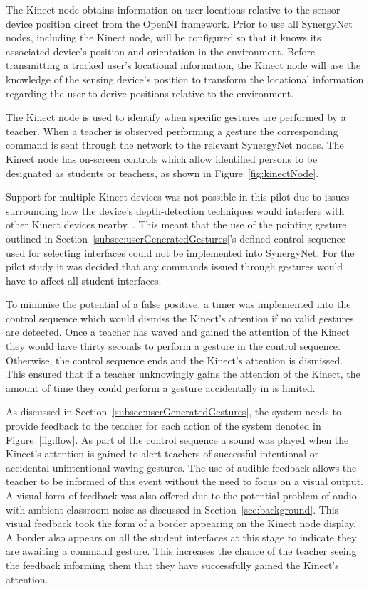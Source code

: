 \documentclass[link]{IWCOMP}
\begin{document}
The Kinect node obtains information on user locations relative to the sensor device position direct from the OpenNI framework.
Prior to use all SynergyNet nodes, including the Kinect node, will be configured so that it knows its associated device's position and orientation in the environment.
Before transmitting a tracked user's locational information, the Kinect node will use the knowledge of the sensing device's position to transform the locational information regarding the user to derive positions relative to the environment.

The Kinect node is used to identify when specific gestures are performed by a teacher.
When a teacher is observed performing a gesture the corresponding command is sent through the network to the relevant SynergyNet nodes.
The Kinect node has on-screen controls which allow identified persons to be designated as students or teachers, as shown in Figure~\ref{fig:kinectNode}.

Support for multiple Kinect devices was not possible in this pilot due to issues surrounding how the device's depth-detection techniques would interfere with other Kinect devices nearby~\cite{Maimone2012,Schroder2011}.
This meant that the use of the pointing gesture outlined in Section~\ref{subsec:userGeneratedGestures}'s defined control sequence used for selecting interfaces could not be implemented into SynergyNet.
For the pilot study it was decided that any commands issued through gestures would have to affect all student interfaces.

To minimise the potential of a false positive, a timer was implemented into the control sequence which would dismiss the Kinect's attention if no valid gestures are detected.
Once a teacher has waved and gained the attention of the Kinect they would have thirty seconds to perform a gesture in the control sequence.
Otherwise, the control sequence ends and the Kinect's attention is dismissed.
This ensured that if a teacher unknowingly gains the attention of the Kinect, the amount of time they could perform a gesture accidentally in is limited.

As discussed in Section~\ref{subsec:userGeneratedGestures}, the system needs to provide feedback to the teacher for each action of the system denoted in Figure~\ref{fig:flow}.
As part of the control sequence a sound was played when the Kinect's attention is gained to alert teachers of successful intentional or accidental unintentional waving gestures.
The use of audible feedback allows the teacher to be informed of this event without the need to focus on a visual output.
A visual form of feedback was also offered due to the potential problem of audio with ambient classroom noise as discussed in Section~\ref{sec:background}.
This visual feedback took the form of a border appearing on the Kinect node display.
A border also appears on all the student interfaces at this stage to indicate they are awaiting a command gesture.
This increases the chance of the teacher seeing the feedback informing them that they have successfully gained the Kinect's attention.
\end{document}
